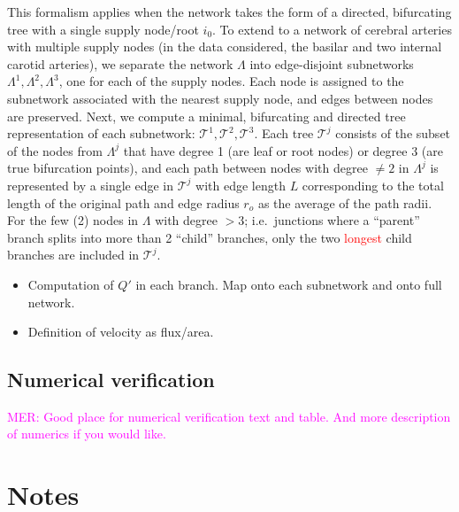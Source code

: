 \documentclass[fleqn,10pt]{wlscirep}
\newcommand{\mer}[1]{\textcolor{magenta}{#1}}
\newcommand{\discuss}[1]{\textcolor{red}{#1}}
\begin{document}
This formalism applies when the network takes the form of a directed,
bifurcating tree with a single supply node/root $i_0$. To extend to a
network of cerebral arteries with multiple supply nodes (in the data
considered, the basilar and two internal carotid arteries), we
separate the network $\Lambda$ into edge-disjoint subnetworks
$\Lambda^1, \Lambda^2, \Lambda^3$, one for each of the supply
nodes. Each node is assigned to the subnetwork associated with the
nearest supply node, and edges between nodes are preserved. Next, we
compute a minimal, bifurcating and directed tree representation of
each subnetwork: $\mathcal{T}^1, \mathcal{T}^2, \mathcal{T}^3$. Each
tree $\mathcal{T}^j$ consists of the subset of the nodes from
$\Lambda^j$ that have degree 1 (are leaf or root nodes) or degree $3$
(are true bifurcation points), and each path between nodes with degree
$\not = 2$ in $\Lambda^j$ is represented by a single edge in
$\mathcal{T}^j$ with edge length $L$ corresponding to the total length
of the original path and edge radius $r_o$ as the average of the path
radii.  For the few (2) nodes in $\Lambda$ with degree $>3$;
i.e.~junctions where a ``parent'' branch splits into more than 2
``child'' branches, only the two \discuss{longest} child branches are
included in $\mathcal{T}^j$.

\begin{itemize}
\item
  Computation of $Q'$ in each branch. Map onto each subnetwork and
  onto full network.
\item
  Definition of velocity as flux/area.
\end{itemize}

\subsection{Numerical verification}

\mer{MER: Good place for numerical verification text and table. And more description of numerics if you would like.}


\newpage
\section{Notes}
\end{document}
